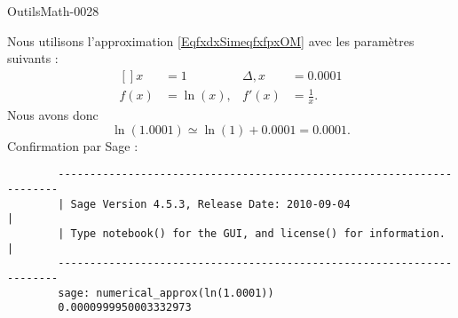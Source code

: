 
\begin{corrige}{OutilsMath-0028}

	Nous utilisons l'approximation \eqref{EqfxdxSimeqfxfpxOM} avec les paramètres suivants :
	\begin{equation}
		\begin{aligned}[]
			x&=1&\Delta, x&=0.0001\\
			f(x)&=\ln(x),&f'(x)&=\frac{1}{ x }.
		\end{aligned}
	\end{equation}
	Nous avons donc
	\begin{equation}
		\ln(1.0001)\simeq \ln(1)+0.0001=0.0001.
	\end{equation}
	Confirmation par Sage :
	\begin{verbatim}
		----------------------------------------------------------------------
		| Sage Version 4.5.3, Release Date: 2010-09-04                       |
		| Type notebook() for the GUI, and license() for information.        |
		----------------------------------------------------------------------
		sage: numerical_approx(ln(1.0001))
		0.0000999950003332973
	\end{verbatim}

\end{corrige}
